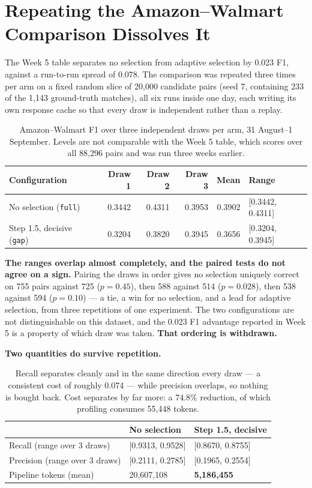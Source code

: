 \documentclass[11pt]{article}
\begin{document}
\section{Repeating the Amazon--Walmart Comparison Dissolves It}
\label{sec:amazon}

The Week 5 table separates no selection from adaptive selection by 0.023 F1, against a
run-to-run spread of 0.078. The comparison was repeated three times per arm on a fixed random
slice of 20{,}000 candidate pairs (seed 7, containing 233 of the 1{,}143 ground-truth
matches), all six runs inside one day, each writing its own response cache so that every draw
is independent rather than a replay.

\begin{table}[H]
\centering
\begin{tabular}{lrrrrl}
\toprule
Configuration & Draw 1 & Draw 2 & Draw 3 & Mean & Range \\
\midrule
No selection (\texttt{full})       & 0.3442 & 0.4311 & 0.3953 & 0.3902 & [0.3442, 0.4311] \\
Step 1.5, decisive (\texttt{gap})  & 0.3204 & 0.3820 & 0.3945 & 0.3656 & [0.3204, 0.3945] \\
\bottomrule
\end{tabular}
\caption{Amazon--Walmart F1 over three independent draws per arm, 31 August--1 September.
Levels are not comparable with the Week 5 table, which scores over all 88{,}296 pairs and was
run three weeks earlier.}
\end{table}

\textbf{The ranges overlap almost completely, and the paired tests do not agree on a sign.}
Pairing the draws in order gives no selection uniquely correct on 755 pairs against 725
($p = 0.45$), then 588 against 514 ($p = 0.028$), then 538 against 594 ($p = 0.10$) --- a
tie, a win for no selection, and a lead for adaptive selection, from three repetitions of one
experiment. The two configurations are not distinguishable on this dataset, and the 0.023 F1
advantage reported in Week 5 is a property of which draw was taken. \textbf{That ordering is
withdrawn.}

\textbf{Two quantities do survive repetition.}

\begin{table}[H]
\centering
\begin{tabular}{lll}
\toprule
 & No selection & Step 1.5, decisive \\
\midrule
Recall (range over 3 draws)    & [0.9313, 0.9528] & [0.8670, 0.8755] \\
Precision (range over 3 draws) & [0.2111, 0.2785] & [0.1965, 0.2554] \\
Pipeline tokens (mean)         & 20{,}607{,}108   & \textbf{5{,}186{,}455} \\
\bottomrule
\end{tabular}
\caption{Recall separates cleanly and in the same direction every draw --- a consistent cost
of roughly 0.074 --- while precision overlaps, so nothing is bought back. Cost separates by
far more: a 74.8\% reduction, of which profiling consumes 55{,}448 tokens.}
\end{table}
\end{document}
